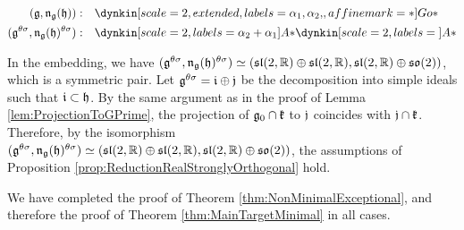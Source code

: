 \begin{align*}
	(\lie{g}, \lieNorm_{\lie{g}}(\lie{h})): \quad & \dynkin[scale=2, extended, labels={\alpha_1, \alpha_2, }, affine mark=*]{G}{o*} \\
	(\lie{g}^{\theta\sigma}, \lieNorm_{\lie{g}}(\lie{h})^{\theta\sigma}): \quad & \dynkin[scale=2, labels={\alpha_2+\alpha_1}]{A}{*}
	\dynkin[scale=2, labels={}]{A}{*}
\end{align*}

In the embedding, we have $(\mathfrak{g}^{\theta\sigma}, \mathfrak{n}_{\mathfrak{g}}(\mathfrak{h})^{\theta\sigma}) \simeq (\mathfrak{sl}(2, \mathbb{R}) \oplus \mathfrak{sl}(2,\mathbb{R}), \mathfrak{sl}(2, \mathbb{R}) \oplus \mathfrak{so}(2))$, which is a symmetric pair.
Let $\mathfrak{g}^{\theta\sigma} = \mathfrak{i} \oplus \mathfrak{j}$ be the decomposition into simple ideals such that $\mathfrak{i}\subset \mathfrak{h}$.
By the same argument as in the proof of Lemma \ref{lem:ProjectionToGPrime}, the projection of $\mathfrak{g}_0\cap \mathfrak{k}$ to $\mathfrak{j}$ coincides with $\mathfrak{j}\cap \mathfrak{k}$.
Therefore, by the isomorphism $(\mathfrak{g}^{\theta\sigma}, \mathfrak{n}_{\mathfrak{g}}(\mathfrak{h})^{\theta\sigma}) \simeq (\mathfrak{sl}(2, \mathbb{R}) \oplus \mathfrak{sl}(2,\mathbb{R}), \mathfrak{sl}(2, \mathbb{R}) \oplus \mathfrak{so}(2))$, the assumptions of Proposition \ref{prop:ReductionRealStronglyOrthogonal} hold.

We have completed the proof of Theorem \ref{thm:NonMinimalExceptional}, and therefore the proof of Theorem \ref{thm:MainTargetMinimal} in all cases.
